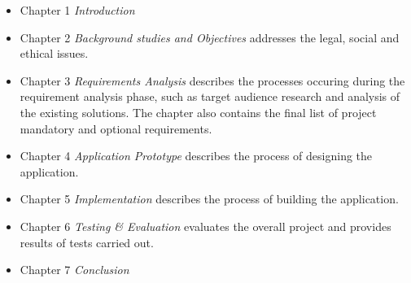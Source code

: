 \begin{itemize}
	\item Chapter 1 \emph{Introduction}
	\item Chapter 2 \emph{Background studies and Objectives} addresses the legal, social and ethical issues.
	\item Chapter 3 \emph{Requirements Analysis} describes the processes occuring during the requirement analysis phase, such as target audience research and analysis of the existing solutions. The chapter also contains the final list of project mandatory and optional requirements.
	\item Chapter 4 \emph{Application Prototype} describes the process of designing the application.
	\item Chapter 5 \emph{Implementation} describes the process of building the application.
	\item Chapter 6 \emph{Testing \& Evaluation} evaluates the overall project and provides results of tests carried out.
	\item Chapter 7 \emph{Conclusion}
\end{itemize}



